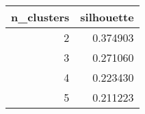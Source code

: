 \begin{tabular}{rr}
\toprule
 n\_clusters &  silhouette \\
\midrule
          2 &    0.374903 \\
          3 &    0.271060 \\
          4 &    0.223430 \\
          5 &    0.211223 \\
\bottomrule
\end{tabular}
